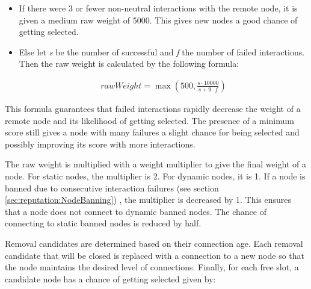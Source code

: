 \begin{itemize}
\item If there were 3 or fewer non-neutral interactions with the remote node, it is given a medium raw weight of 5000.
This gives new nodes a good chance of getting selected.
\item Else let {\it s} be the number of successful and {\it f} the number of failed interactions.
Then the raw weight is calculated by the following formula:

\begin{figure}[t!]
\end{figure}

\begin{align*}
\mathit{rawWeight} = \max\left(500, \frac{s \cdot 10000}{s + 9 \cdot f}\right)
\end{align*}
\end{itemize}

This formula guarantees that failed interactions rapidly decrease the weight of a remote node and its likelihood of getting selected.
The presence of a minimum score still gives a node with many failures a slight chance for being selected and possibly improving its score with more interactions.

The raw weight is multiplied with a weight multiplier to give the final weight of a node.
For static nodes, the multiplier is 2.
For dynamic nodes, it is 1.
If a node is banned due to consecutive interaction failures (see section \autoref{sec:reputation:NodeBanning}) , the multiplier is decreased by 1.
This ensures that a node does not connect to dynamic banned nodes.
The chance of connecting to static banned nodes is reduced by half.

Removal candidates are determined based on their connection age.
Each removal candidate that will be closed is replaced with a connection to a new node so that the node maintains the desired level of connections.
Finally, for each free slot, a candidate node has a chance of getting selected given by:

